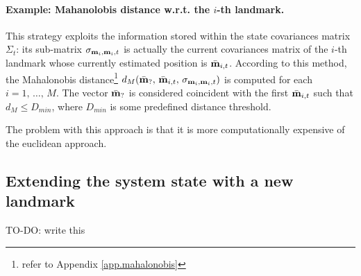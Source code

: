 	\paragraph{Example: Mahanolobis distance w.r.t. the $i$-th landmark.}
		This strategy exploits the information stored within the state covariances matrix $\Sigma_t$: its sub-matrix $\sigma_{\boldsymbol{\mathrm{{m}}}_i,\boldsymbol{\mathrm{{m}}}_i,t}$ is actually the current covariances matrix of the $i$-th landmark whose currently estimated position is $\bar{\boldsymbol{\mathrm{{m}}}}_{i,t}$. 
		According to this method, the Mahalonobis distance\footnote{\label{sec.ekf.mahalobis}refer to Appendix \ref{app.mahalonobis}} $d_M(\bar{\boldsymbol{\mathrm{{m}}}}_?,\, \bar{\boldsymbol{\mathrm{{m}}}}_{i,t},\, \sigma_{\boldsymbol{\mathrm{{m}}}_i,\boldsymbol{\mathrm{{m}}}_i,t})$ is computed for each $i = 1,\, \ldots,\, M$.
		The vector $\bar{\boldsymbol{\mathrm{{m}}}}_?$ is considered coincident with the first $\bar{\boldsymbol{\mathrm{{m}}}}_{i,t}$ such that $d_M\leq D_{min}$, where $D_{min}$ is some predefined distance threshold.
		
		The problem with this approach is that it is more computationally expensive of the euclidean approach.
		
\subsection{Extending the system state with a new landmark}
	\label{sec.state_extension}
	TO-DO: write this